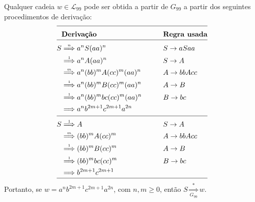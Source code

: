\documentclass[12pt]{article}
\def\myling{{99}} %
\newcommand{\deriv}[1]{\stackrel{\scriptscriptstyle #1}{\Longrightarrow}}
\newcommand{\derivG}[2]{\mathop{\Longrightarrow}\limits_{\scriptscriptstyle #2}^{\scriptscriptstyle #1}}
\begin{document}
\begin{tcolorbox}[breakable,rounded corners, colback=yellow!5, colframe=red!40!black, title={$\mathcal{L}_{\myling} \subseteq\mathcal{L}(G_{99})$, ou seja, se $w\in \mathcal{L}_{\myling}$, então $S \deriv{*} w$.}]
Qualquer cadeia $w\in \mathcal{L}_{\myling}$ pode ser obtida a partir de $G_{99}$ a partir dos seguintes procedimentos de derivação:
		\begin{alignat*}{2}
		\cline{1-4}
		   & \textbf{Derivação}   &\qquad& \textbf{Regra usada}\\[-10pt]
		\cline{1-4}
		 S & \deriv{n} a^nS(aa)^n                & &S \to aSaa\\ 
		   & \deriv{1} a^nA(aa)^n                & &S \to A \\
	    & \deriv{m} a^n(bb)^mA(cc)^m(aa)^n    & &A \to bbAcc \\ 
	    & \deriv{1} a^n(bb)^mB(cc)^m(aa)^n    & &A \to B \\ 
     & \deriv{1} a^n(bb)^mbc(cc)^m(aa)^n   & &B \to bc \\ 
		   & \deriv{}  a^nb^{2m+1}c^{2m+1}a^{2n} & & \\[-8pt]
		\cline{1-4}
		 S & \deriv{1} A                         & & S \to A \\
	    & \deriv{m} (bb)^mA(cc)^m             & & A \to bbAcc \\ 
	    & \deriv{1} (bb)^mB(cc)^m             & & A \to B \\ 
     & \deriv{1} (bb)^mbc(cc)^m            & & B \to bc \\ 
		   & \deriv{}  b^{2m+1}c^{2m+1}          & & \\[-10pt]
		\cline{1-4}
		\end{alignat*}
  Portanto, se $w = a^nb^{2m+1}c^{2m+1}a^{2n}$, com $n,m \geqslant 0$, então $S \derivG{*}{G_{99}} w$.
\end{tcolorbox}
\end{document}
